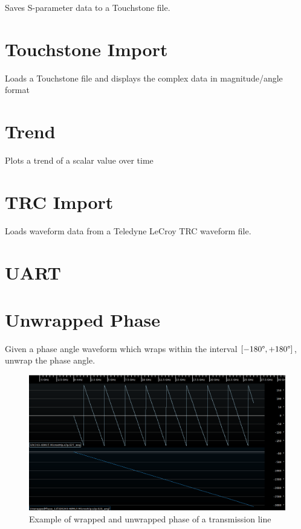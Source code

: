Saves S-parameter data to a Touchstone file.

\pagebreak
\section{Touchstone Import}

Loads a Touchstone file and displays the complex data in magnitude/angle format

\pagebreak
\section{Trend}

Plots a trend of a scalar value over time

\pagebreak
\section{TRC Import}

Loads waveform data from a Teledyne LeCroy TRC waveform file.

\pagebreak
\section{UART}

\pagebreak
\section{Unwrapped Phase}

Given a phase angle waveform which wraps within the interval $[-180\degree, +180 \degree]$, unwrap the phase angle.

\begin{figure}[h]
\centering
\includegraphics[width=16cm]{images/filters/unwrapped-phase.png}
\caption{Example of wrapped and unwrapped phase of a transmission line}
\label{unwrapped_phase_example}
\end{figure}

